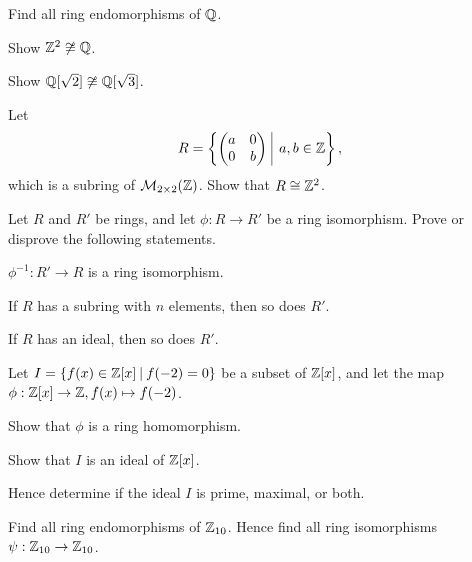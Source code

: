 \begin{problem}
    Find all ring endomorphisms of $\mathbb{Q}$.
\end{problem}

\begin{problem}
    Show $\mathbb{Z}^2 \not\cong \mathbb{Q}$.
\end{problem}

\begin{problem}
    Show $\mathbb{Q}[\sqrt2] \not\cong \mathbb{Q}[\sqrt3]$.
\end{problem}

\begin{problem}
    Let
    \[
        R = \left\{\begin{pmatrix}a&0\\0&b\end{pmatrix}\vert a,b \in \Z\right\},
    \]
    which is a subring of $\mathcal{M}_{2\times2}(\mathbb{Z})$. Show that $R \cong \mathbb{Z}^2$.
\end{problem}

\begin{problem}
    Let $R$ and $R'$ be rings, and let $\phi: R \to R'$ be a ring isomorphism. Prove or disprove the following statements.
    \begin{partquestions}{\alph*}
        \item $\phi^{-1}: R' \to R$ is a ring isomorphism.
        \item If $R$ has a subring with $n$ elements, then so does $R'$.
        \item If $R$ has an ideal, then so does $R'$.
    \end{partquestions}
\end{problem}

\begin{problem}
    Let $I = \{f(x) \in \Z[x] \vert f(-2) = 0\}$ be a subset of $\mathbb{Z}[x]$, and let the map $\phi:\mathbb{Z}[x]\to\mathbb{Z}, f(x) \mapsto f(-2)$.
    \begin{partquestions}{\roman*}
        \item Show that $\phi$ is a ring homomorphism.
        \item Show that $I$ is an ideal of $\mathbb{Z}[x]$.
        \item Hence determine if the ideal $I$ is prime, maximal, or both.
    \end{partquestions}
\end{problem}

\begin{problem}
    Find all ring endomorphisms of $\mathbb{Z}_{10}$.\newline
    Hence find all ring isomorphisms $\psi: \mathbb{Z}_{10} \to \mathbb{Z}_{10}$.
\end{problem}

